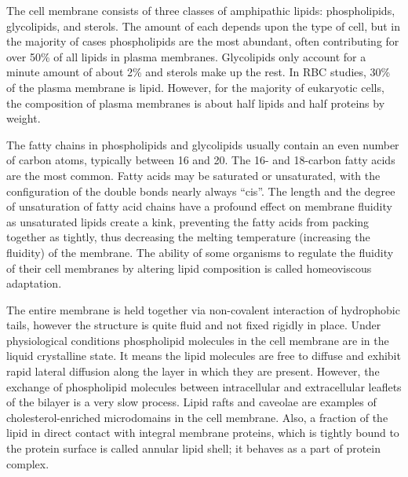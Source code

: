 The cell membrane consists of three classes of amphipathic lipids: phospholipids, glycolipids, and sterols. The amount of each depends upon the type of cell, but in the majority of cases phospholipids are the most abundant, often contributing for over 50\% of all lipids in plasma membranes. Glycolipids only account for a minute amount of about 2\% and sterols make up the rest. In RBC studies, 30\% of the plasma membrane is lipid. However, for the majority of eukaryotic cells, the composition of plasma membranes is about half lipids and half proteins by weight.

The fatty chains in phospholipids and glycolipids usually contain an even number of carbon atoms, typically between 16 and 20. The 16- and 18-carbon fatty acids are the most common. Fatty acids may be saturated or unsaturated, with the configuration of the double bonds nearly always ``cis''. The length and the degree of unsaturation of fatty acid chains have a profound effect on membrane fluidity as unsaturated lipids create a kink, preventing the fatty acids from packing together as tightly, thus decreasing the melting temperature (increasing the fluidity) of the membrane. The ability of some organisms to regulate the fluidity of their cell membranes by altering lipid composition is called homeoviscous adaptation.

The entire membrane is held together via non-covalent interaction of hydrophobic tails, however the structure is quite fluid and not fixed rigidly in place. Under physiological conditions phospholipid molecules in the cell membrane are in the liquid crystalline state. It means the lipid molecules are free to diffuse and exhibit rapid lateral diffusion along the layer in which they are present. However, the exchange of phospholipid molecules between intracellular and extracellular leaflets of the bilayer is a very slow process. Lipid rafts and caveolae are examples of cholesterol-enriched microdomains in the cell membrane. Also, a fraction of the lipid in direct contact with integral membrane proteins, which is tightly bound to the protein surface is called annular lipid shell; it behaves as a part of protein complex.

